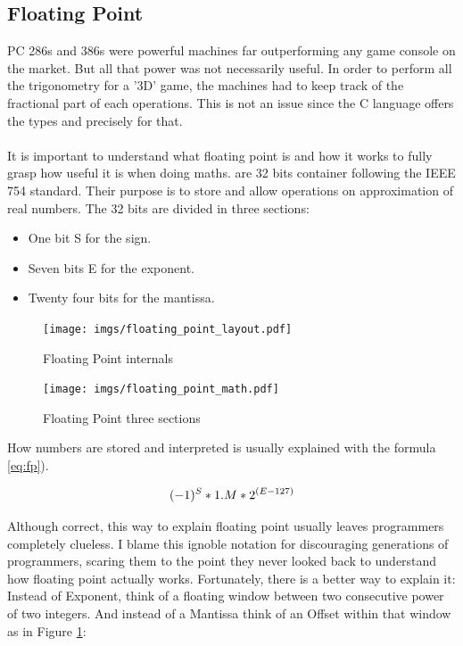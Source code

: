 \documentclass[book.tex]{subfiles}
\begin{document}
  \subsection{Floating Point}
  
   PC 286s and 386s were powerful machines far outperforming any game console on the market. But all that power was not necessarily useful. In order to perform all the trigonometry for a '3D' game, the machines had to keep track of the fractional part of each operations. This is not an issue since the C language offers the types  and  precisely for that.\\
\\
It is important to understand what floating point is and how it works to fully grasp how useful it is when doing maths.  are 32 bits container following the IEEE 754 standard. Their purpose is to store and allow operations on approximation of real numbers. The 32 bits are divided in three sections:\\
\begin{itemize}
  \item One bit S for the sign.
  \item Seven bits E for the exponent.
  \item Twenty four bits for the mantissa.
\end{itemize} 

\begin{figure}[H]
\centering
\texttt{[image: imgs/floating\_point\_layout.pdf]}
\caption{Floating Point internals}
\label{fig:fp_internals}
\end{figure}
  \bigskip



\begin{figure}[H]
\centering
\texttt{[image: imgs/floating\_point\_math.pdf]}
\caption{Floating Point three sections}
\label{fig:fp_regions}
\end{figure}
  \bigskip  


How numbers are stored and interpreted is usually explained with the formula \ref{eq:fp}).\


\begin{equation}\label{eq:fp}
\large
(-1)^S * 1.M * 2^{(E-127)}
\end{equation}
 
\bigskip  
Although correct, this way to explain floating point usually leaves programmers completely clueless. I blame this ignoble notation for discouraging generations of programmers, scaring them to the point they never looked back to understand how floating point actually works. Fortunately, there is a better way to explain it: Instead of Exponent, think of a floating window between two consecutive power of two integers. And instead of a Mantissa think of an Offset within that window as in Figure \ref{fig:fp_internals}:
  
\end{document}
